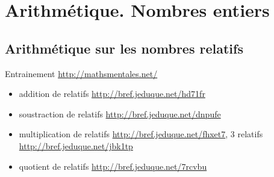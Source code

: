 \documentclass[main.tex]{subfiles}
\begin{document}
 
\cleardoublepage 
{}  
\pagestyle{scrheadings} %
\onehalfspacing 
\chapter{Arithmétique. Nombres entiers}


%	 

%	 


\section{Arithmétique sur les nombres relatifs}
Entrainement \url{http://mathsmentales.net/}
\begin{itemize}
	\item  addition de relatifs \url{http://bref.jeduque.net/hd71fr}
	\item  soustraction de relatifs \url{http://bref.jeduque.net/dnpufe}
	\item  multiplication de relatifs \url{http://bref.jeduque.net/fhxet7}, 3 relatifs \url{http://bref.jeduque.net/jbk1tp}
	\item  quotient de relatifs \url{http://bref.jeduque.net/7rcvbu} 
\end{itemize}

%	 
\end{document}
